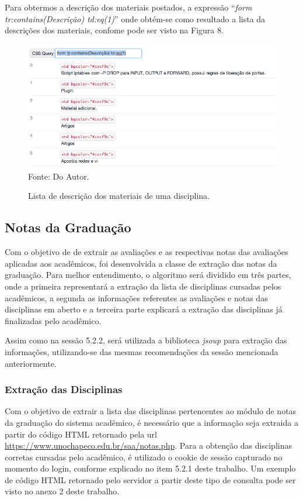 Para obtermos a descrição dos materiais postados, a expressão ``\emph{form tr:contains(Descrição) td:eq(1)}'' onde obtém-se como resultado a lista da descrições dos materiais, confome pode ser visto na Figura 8.

\begin{figure}[!htb]
     \centering
     \caption[Extração de Informações - Lista das descrições dos materiais]{Lista de descrição dos materiais de uma disciplina.}
     \includegraphics[scale=0.6]{imagens/listamateriaisdisciplinasdescricao.png}
     \\  Fonte: Do Autor.
\end{figure}

\newpage

\subsection{Notas da Graduação}
Com o objetivo de de extrair as avaliações e as respectivas notas das avaliações aplicadas aos acadêmicos, foi desenvolvida a classe de extração das notas da graduação. Para melhor entendimento, o algoritmo será dividido em três partes, onde a primeira representará a extração da lista de disciplinas cursadas pelos acadêmicos, a segunda as informações referentes as avaliações e notas das disciplinas em aberto e a terceira parte explicará a extração das disciplinas já finalizadas pelo acadêmico.

Assim como na sessão 5.2.2, será utilizada a biblioteca \emph{jsoup} para extração das informações, utilizando-se das mesmas recomendações da sessão mencionada anteriormente.

\subsubsection{Extração das Disciplinas}
Com o objetivo de extrair a lista das disciplinas pertencentes ao módulo de notas da graduação do sistema acadêmico, é necessário que a informação seja extraida a partir do código HTML retornado pela url \url{https://www.unochapeco.edu.br/saa/notas.php}. Para a obtenção das disciplinas corretas cursadas pelo acadêmico, é utilizado o cookie de sessão capturado no momento do login, conforme explicado no item 5.2.1 deste trabalho. Um exemplo de código HTML retornado pelo servidor a partir deste tipo de consulta pode ser visto no anexo 2 deste trabalho.


